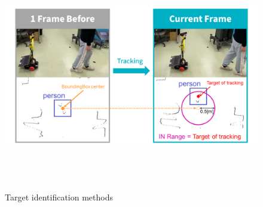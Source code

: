 \begin{figure}[h]
    \begin{center}
    \includegraphics[height=100mm,clip]{figure/Target-identification-methods.png}
    \caption{Target identification methods}
    \label{Target identification methods}
    \end{center}
\end{figure}

\clearpage

